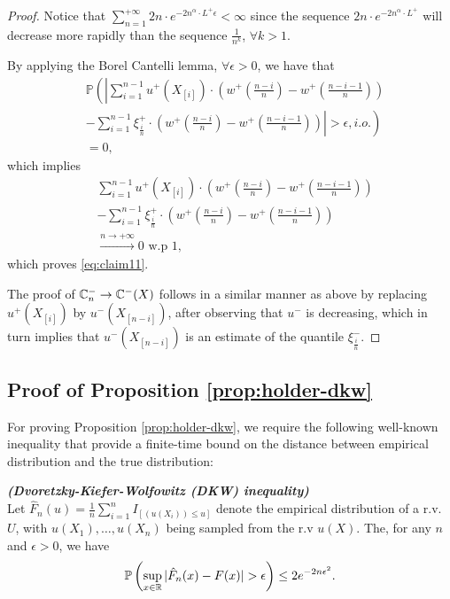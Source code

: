 \begin{proof}
Notice that $\sum_{n=1}^{+\infty}  2n \cdot e^{-2n^{\alpha}\cdot L^{+} \epsilon}< \infty$ since the sequence 
$2n \cdot e^{-2n^{\alpha}\cdot L^{+}}$ will decrease more rapidly than the sequence
$\frac{1}{n^k}$, $\forall k>1$.

By applying the Borel Cantelli lemma,  $\forall \epsilon >0$, we have that
\begin{align*}
&\mathbb{P} \left( \left| \sum_{i=1}^{n-1} u^+\left(X_{[i]}\right) \cdot \left(w^+\left(\frac{n-i}{n} \right)  - w^+\left(\frac{n-i-1}{n} \right) \right)\right.\right. \\
&\left.\left.-
\sum_{i=1}^{n-1} \xi^+_{\frac{i}{n}} \cdot \left(w^+\left(\frac{n-i}{n} \right)  - w^+\left(\frac{n-i-1}{n} \right) \right) \right| >
\epsilon , i.o.\right) \\
&=0, 
\end{align*}
which implies 
\begin{align*}
&\sum_{i=1}^{n-1} u^+\left(X_{[i]}\right) \cdot \left(w^+\left(\frac{n-i}{n} \right)  - w^+\left(\frac{n-i-1}{n} \right) \right) \\
&- \sum_{i=1}^{n-1}
\xi^+_{\frac{i}{n}} \cdot \left(w^+\left(\frac{n-i}{n} \right)  - w^+\left(\frac{n-i-1}{n} \right) \right)\\ &\xrightarrow{n \rightarrow
+\infty} 0 \text{   w.p } 1 ,
\end{align*}
which proves \eqref{eq:claim11}. 

The proof of 
$\mathbb{C}_{n}^{-} \rightarrow \mathbb{C}^{-}(X)$ follows in a similar manner as above by replacing $u^+(X_{[i]})$ by $u^-(X_{[n-i]})$, after observing that $u^{-}$ is decreasing, which in turn implies that
$u^-(X_{[n-i]})$ is an estimate of the quantile $\xi^{-}_{\frac{i}{n}}$.
\end{proof}

\subsection*{Proof of Proposition \ref{prop:holder-dkw}}
For proving Proposition \ref{prop:holder-dkw}, we require the following well-known inequality that provide a finite-time bound on the distance between empirical distribution and the true distribution:
\begin{lemma}{\textbf{\textit{(Dvoretzky-Kiefer-Wolfowitz (DKW) inequality)}}}\\
Let ${\hat F_n}(u)=\frac{1}{n} \sum_{i=1}^n I_{\left[(u(X_i)) \leq u\right]}$ denote the empirical distribution of a r.v. $U$, with $u(X_1),\ldots,u(X_n)$ being sampled from the r.v $u(X)$.
The, for any $n$ and $\epsilon>0$, we have
$$
\Prob{\sup_{x\in \mathbb{R}}|\hat{F}_n(x)-F(x)|>\epsilon } \leq 2 e^{-2n\epsilon^2}.
$$
\end{lemma}

